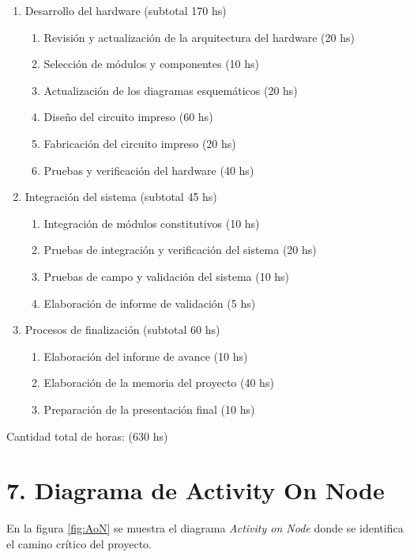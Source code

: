 \documentclass[11pt]{charter}
\begin{document}
\begin{enumerate}
\begin{enumerate}
  \end{enumerate}
\item Desarrollo del hardware \hfill (subtotal 170 hs)
  \begin{enumerate}
  \item Revisión y actualización de la arquitectura del hardware \hfill (20 hs)
  \item Selección de módulos y componentes \hfill (10 hs)
  \item Actualización de los diagramas esquemáticos \hfill (20 hs)
  \item Diseño del circuito impreso \hfill (60 hs)
  \item Fabricación del circuito impreso \hfill (20 hs)
  \item Pruebas y verificación del hardware \hfill (40 hs)
  \end{enumerate}
\item Integración del sistema \hfill (subtotal 45 hs)
  \begin{enumerate}
  \item Integración de módulos constitutivos \hfill (10 hs)
  \item Pruebas de integración y verificación del sistema \hfill (20 hs)
  \item Pruebas de campo y validación del sistema \hfill (10 hs)
  \item Elaboración de informe de validación \hfill (5 hs)
  \end{enumerate}
\item Procesos de finalización \hfill (subtotal 60 hs)
  \begin{enumerate}
  \item Elaboración del informe de avance \hfill (10 hs)
  \item Elaboración de la memoria del proyecto \hfill (40 hs)
  \item Preparación de la presentación final \hfill (10 hs)
  \end{enumerate}
\end{enumerate}

Cantidad total de horas: (630 hs)

\newpage

\section{7. Diagrama de Activity On Node}
\label{sec:AoN}

En la figura \ref{fig:AoN} se muestra el diagrama \textit{Activity on Node} donde se identifica el camino crítico del proyecto.
\end{document}
